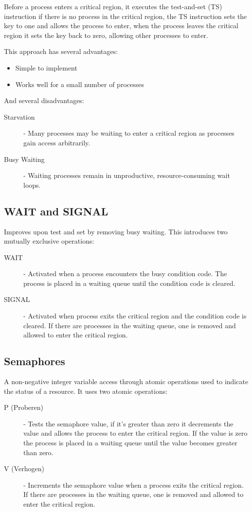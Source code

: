 \documentclass[12pt letter]{report}
\begin{document}
Before a process enters a critical region, it executes the
test-and-set (TS) instruction
if there is no process in the critical region, the TS instruction
sets the key to
one and allows the process to enter, when the process leaves the
critical region it
sets the key back to zero, allowing other processes to enter.

This approach has several advantages:
\begin{itemize}
  \item Simple to implement
  \item  Works well for a small number of processes
\end{itemize}

And several disadvantages:
\begin{description}
  \item[Starvation]  - Many processes may be waiting to enter a
    critical region as processes gain access arbitrarily.
  \item[Busy Waiting] - Waiting processes remain in unproductive,
    resource-consuming wait loops.
\end{description}

\subsection{WAIT and SIGNAL}

Improves upon test and set by removing busy waiting. This introduces
two mutually exclusive operations:
\begin{description}
  \item[WAIT]  - Activated when a process encounters the busy
    condition code. The
    process is placed in a waiting queue until the condition code is cleared.
  \item[SIGNAL] - Activated when process exits the critical region
    and the condition code is cleared. If there are processes in the
    waiting queue, one is removed and allowed to enter the critical region.
\end{description}

\subsection{Semaphores}

A non-negative integer variable access through atomic operations used
to indicate the status of a resource. It uses two atomic operations:
\begin{description}
  \item[P (Proberen)] - Tests the semaphore value, if it's greater
    than zero it decrements the value and allows the process to enter
    the critical region. If the value is zero the process is placed in
    a waiting queue until the value becomes greater than zero.
  \item[V (Verhogen)] - Increments the semaphore value when a process
    exits the critical region. If there are processes in the waiting
    queue, one is removed and allowed to enter the critical region.
\end{description}
\end{document}
